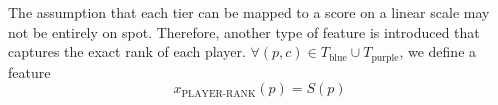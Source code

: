 The assumption that each tier can be mapped to a score on a linear scale may not be entirely on spot.
Therefore, another type of feature is introduced that captures the exact rank of each player.
$\forall(p, c) \in T_\text{blue} \cup T_\text{purple}$, we define a feature
\[
x_\text{PLAYER-RANK
}(p) = S(p)
\]

